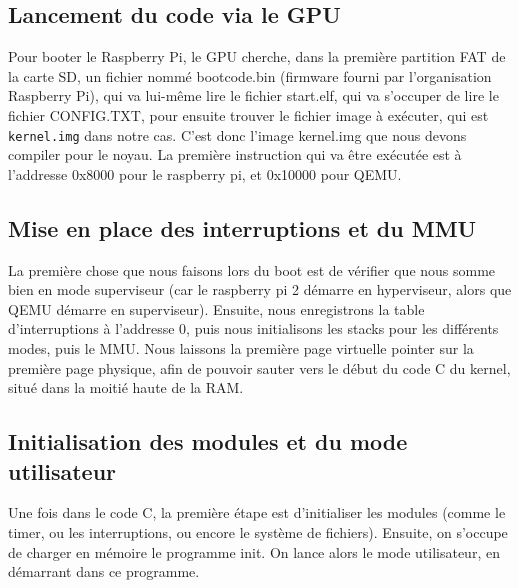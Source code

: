 \documentclass[a4paper]{article}
\begin{document}
\subsection{Lancement du code via le GPU}

Pour booter le Raspberry Pi, le GPU cherche, dans la première partition FAT de la
carte SD, un fichier nommé bootcode.bin (firmware fourni par l'organisation Raspberry Pi),
qui va lui-même lire le fichier start.elf, qui va s'occuper de lire le fichier CONFIG.TXT, pour
ensuite trouver le fichier image à exécuter, qui est \verb!kernel.img! dans notre
cas.
C'est donc l'image kernel.img que nous devons compiler pour le noyau. La
première instruction qui va être exécutée est à l'addresse 0x8000 pour le
raspberry pi, et 0x10000 pour QEMU.

\subsection{Mise en place des interruptions et du MMU}

La première chose que nous faisons lors du boot est de vérifier que nous somme
bien en mode superviseur (car le raspberry pi 2 démarre en hyperviseur, alors
que QEMU démarre en superviseur). Ensuite, nous enregistrons la table
d'interruptions à l'addresse 0, puis nous initialisons les stacks pour les
différents modes, puis le MMU. Nous laissons la première page virtuelle pointer
sur la première page physique, afin de pouvoir sauter vers le début du code C du
kernel, situé dans la moitié haute de la RAM.

\subsection{Initialisation des modules et du mode utilisateur}

Une fois dans le code C, la première étape est d'initialiser les modules (comme
le timer, ou les interruptions, ou encore le système de fichiers). Ensuite, on
s'occupe de charger en mémoire le programme init. On lance alors le mode
utilisateur, en démarrant dans ce programme.
\end{document}
